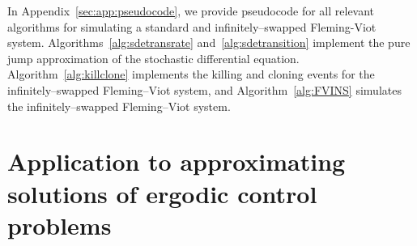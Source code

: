 \documentclass[english,11pt]{article}%
\numberwithin{equation}{section}
\numberwithin{example}{section}
\numberwithin{theorem}{section}
\begin{document}
In Appendix~\ref{sec:app:pseudocode}, we provide pseudocode for all relevant algorithms for simulating a standard and infinitely--swapped Fleming-Viot system. Algorithms~\ref{alg:sdetransrate} and~\ref{alg:sdetransition} implement the pure jump approximation of the stochastic differential equation. Algorithm~\ref{alg:killclone} implements the killing and cloning events for the infinitely--swapped Fleming--Viot system, and Algorithm~\ref{alg:FVINS} simulates the infinitely--swapped Fleming--Viot system. 





\section{Application to approximating solutions of ergodic control problems}
\end{document}
